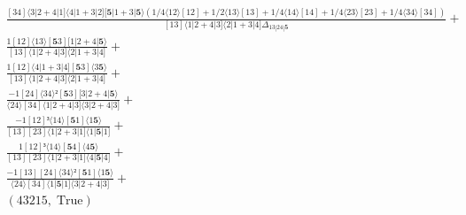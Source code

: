 \documentclass[varwidth, border=5pt]{standalone}
\begin{document}
\begin{my}
$\begin{gathered}
\scriptscriptstyle\frac{[34]⟨3|2+4|1]⟨4|1+3|2][𝟓|1+3|𝟓⟩(1/4⟨12⟩[12]+1/2⟨13⟩[13]+1/4⟨14⟩[14]+1/4⟨23⟩[23]+1/4⟨34⟩[34])}{[13]⟨1|2+4|3]⟨2|1+3|4]Δ_{13|24|𝟓}} +\\
\scriptscriptstyle\frac{1[12]⟨13⟩[𝟓3][1|2+4|𝟓⟩}{[13]⟨1|2+4|3]⟨2|1+3|4]} +\\
\scriptscriptstyle\frac{1[12]⟨4|1+3|4][𝟓3]⟨3𝟓⟩}{[13]⟨1|2+4|3]⟨2|1+3|4]} +\\
\scriptscriptstyle\frac{-1[24]⟨34⟩²[𝟓3][3|2+4|𝟓⟩}{⟨24⟩[34]⟨1|2+4|3]⟨3|2+4|3]} +\\
\scriptscriptstyle\frac{-1[12]³⟨14⟩[𝟓1]⟨1𝟓⟩}{[13][23]⟨1|2+3|1]⟨1|𝟓|1]} +\\
\scriptscriptstyle\frac{1[12]³⟨14⟩[𝟓4]⟨4𝟓⟩}{[13][23]⟨1|2+3|1]⟨4|𝟓|4]} +\\
\scriptscriptstyle\frac{-1[13][24]⟨34⟩²[𝟓1]⟨1𝟓⟩}{⟨24⟩[34]⟨1|𝟓|1]⟨3|2+4|3]} +\\
\scriptscriptstyle(43215,\;\text{True}) \phantom{+}
\end{gathered}$
\end{my}
\end{document}
